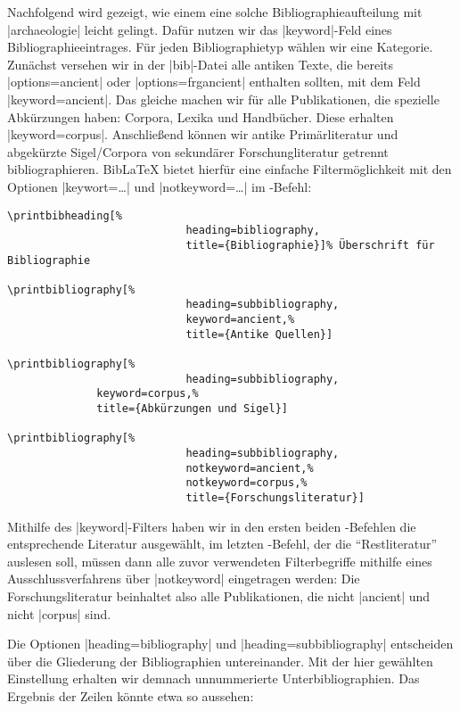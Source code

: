 \documentclass[a4paper,10pt,ngerman]{ltxdoc}
\begin{document}
Nachfolgend wird gezeigt, wie einem eine solche Bibliographieaufteilung mit |archaeologie| leicht gelingt. Dafür nutzen wir das |keyword|-Feld eines Bibliographieeintrages. Für jeden Bibliographietyp wählen wir eine Kategorie. Zunächst versehen wir in der |bib|-Datei  alle antiken Texte, die bereits |options={ancient}| oder |options={frgancient}| enthalten sollten, mit dem Feld |keyword={ancient}|. Das gleiche machen wir für alle Publikationen, die spezielle Abkürzungen haben: Corpora, Lexika und Handbücher. Diese erhalten |keyword={corpus}|. Anschließend können wir antike Primärliteratur und abgekürzte Sigel/Corpora von sekundärer Forschungliteratur getrennt bibliographieren. Bib\LaTeX{} bietet hierfür eine einfache Filtermöglichkeit mit den Optionen |keywort=…| und |notkeyword=…| im -Befehl:

\begin{lstlisting}
\printbibheading[%
							heading=bibliography,
							title={Bibliographie}]% Überschrift für Bibliographie

\printbibliography[%
							heading=subbibliography,
							keyword=ancient,%
							title={Antike Quellen}]

\printbibliography[%
							heading=subbibliography,
              keyword=corpus,%
              title={Abkürzungen und Sigel}]

\printbibliography[%
							heading=subbibliography,
							notkeyword=ancient,%
							notkeyword=corpus,%
							title={Forschungsliteratur}]
\end{lstlisting}

Mithilfe des |keyword|-Filters haben wir in den ersten beiden -Befehlen die entsprechende Literatur ausgewählt, im letzten -Befehl, der die \enquote{Restliteratur} auslesen soll, müssen dann alle zuvor verwendeten Filterbegriffe mithilfe eines Ausschlussverfahrens über |notkeyword| eingetragen werden: Die Forschungsliteratur beinhaltet also alle Publikationen, die nicht |ancient| und nicht |corpus| sind.

Die Optionen |heading=bibliography| und |heading=subbibliography| entscheiden über die Gliederung der Bibliographien untereinander. Mit der hier gewählten Einstellung erhalten wir demnach unnummerierte Unterbibliographien. Das Ergebnis der Zeilen könnte etwa so aussehen:
\end{document}
